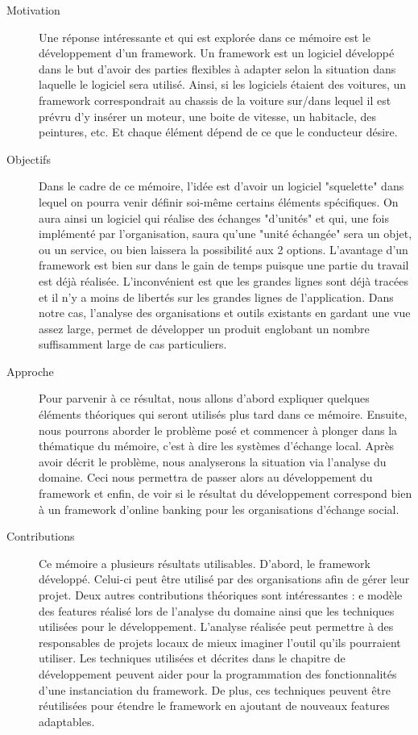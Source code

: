 \begin{description}
\item[Motivation] 
Une réponse intéressante et qui est explorée dans ce mémoire est le développement d'un framework.  Un framework est un logiciel développé dans le but d'avoir des parties flexibles à adapter selon la situation dans laquelle le logiciel sera utilisé.  Ainsi,  si les logiciels étaient des voitures,  un framework correspondrait au chassis de la voiture sur/dans lequel il est prévru d'y insérer un moteur,  une boite de vitesse,  un habitacle,  des peintures,  etc.  Et chaque élément dépend de ce que le conducteur désire.  

\item[Objectifs] 
Dans le cadre de ce mémoire,  l'idée est d'avoir un logiciel "squelette" dans lequel on pourra venir définir soi-même certains éléments spécifiques.   On aura ainsi un logiciel qui réalise des échanges "d'unités" et qui,  une fois implémenté par l'organisation,  saura qu'une "unité échangée" sera un objet,  ou un service,  ou bien laissera la possibilité aux 2 options.  L'avantage d'un framework est bien sur dans le gain de temps puisque une partie du travail est déjà réalisée.  L'inconvénient est que les grandes lignes sont déjà tracées et il n'y a moins de libertés sur les grandes lignes de l'application.  Dans notre cas,  l'analyse des organisations et outils existants en gardant une vue assez large,  permet de développer un produit englobant un nombre suffisamment large de cas particuliers.  

\item[Approche]
Pour parvenir à ce résultat,  nous allons d'abord expliquer quelques éléments théoriques qui seront utilisés plus tard dans ce mémoire.  Ensuite,  nous pourrons aborder le problème posé et commencer à plonger dans la thématique du mémoire,  c'est à dire les systèmes d'échange local.  Après avoir décrit le problème,  nous analyserons la situation via l'analyse du domaine.  Ceci nous permettra de passer alors au développement du framework et enfin,  de voir si le résultat du développement correspond bien à un framework d'online banking pour les organisations d'échange social.

\item[Contributions]

Ce mémoire a plusieurs résultats utilisables.  D'abord,  le framework développé.  Celui-ci peut être utilisé par des organisations afin de gérer leur projet.  Deux autres contributions théoriques sont intéressantes : e modèle des features réalisé lors de l'analyse du domaine ainsi que les techniques utilisées pour le développement.  L'analyse réalisée peut permettre à des responsables de projets locaux de mieux imaginer l'outil qu'ils pourraient utiliser.  Les techniques utilisées et décrites dans le chapitre de développement peuvent aider pour la programmation des fonctionnalités d'une instanciation du framework.  De plus,  ces techniques peuvent être réutilisées pour étendre le framework en ajoutant de nouveaux features adaptables.


\end{description}
